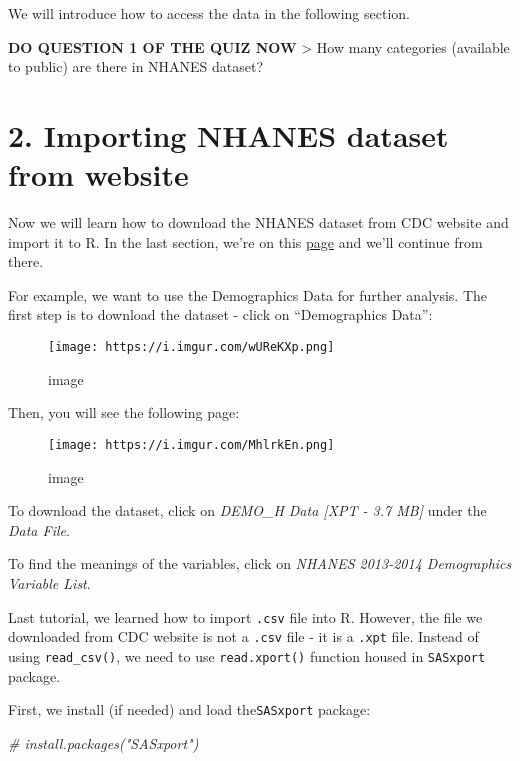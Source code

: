 \documentclass[
]{book}
\newenvironment{Shaded}{\begin{snugshade}}{\end{snugshade}}
\newcommand{\CommentTok}[1]{\textcolor[rgb]{0.56,0.35,0.01}{\textit{#1}}}
\begin{document}
We will introduce how to access the data in the following section.

\textbf{DO QUESTION 1 OF THE QUIZ NOW}
\textgreater{} How many categories (available to public) are there in NHANES dataset?

\hypertarget{importing-nhanes-dataset-from-website}{%
\section{2. Importing NHANES dataset from website}\label{importing-nhanes-dataset-from-website}}

Now we will learn how to download the NHANES dataset from CDC website and import it to R. In the last section, we're on this \href{https://wwwn.cdc.gov/nchs/nhanes/continuousnhanes/default.aspx?BeginYear=2013}{page} and we'll continue from there.

For example, we want to use the Demographics Data for further analysis. The first step is to download the dataset - click on ``Demographics Data'':

\begin{figure}
\centering
\texttt{[image: https://i.imgur.com/wUReKXp.png]}
\caption{image}
\end{figure}

Then, you will see the following page:

\begin{figure}
\centering
\texttt{[image: https://i.imgur.com/MhlrkEn.png]}
\caption{image}
\end{figure}

To download the dataset, click on \emph{DEMO\_H Data {[}XPT - 3.7 MB{]}} under the \emph{Data File}.

To find the meanings of the variables, click on \emph{NHANES 2013-2014 Demographics Variable List}.

Last tutorial, we learned how to import \texttt{.csv} file into R. However, the file we downloaded from CDC website is not a \texttt{.csv} file - it is a \texttt{.xpt} file. Instead of using \texttt{read\_csv()}, we need to use \texttt{read.xport()} function housed in \texttt{SASxport} package.

First, we install (if needed) and load the\texttt{SASxport} package:

\begin{Shaded}
\begin{Highlighting}[]
\CommentTok{\# install.packages("SASxport")}
\end{Highlighting}
\end{Shaded}
\end{document}
